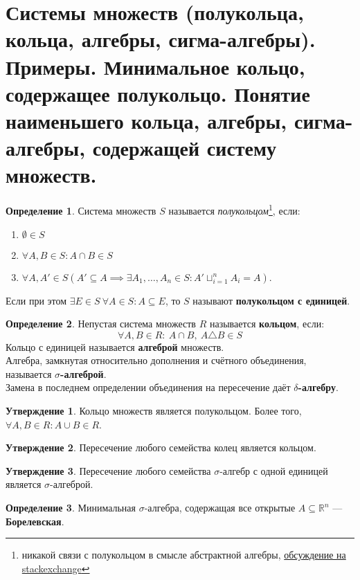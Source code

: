 \documentclass[11pt,a4paper]{report}
\def\Real{\mathbb{R}}
\theoremstyle{definition}
\theoremstyle{definition}
\newtheorem{preposition}{Утверждение}[section]
\theoremstyle{definition}
\newtheorem{definition}{Определение}[section]
\begin{document}
	\section{Системы множеств (полукольца, кольца, алгебры, сигма-алгебры). Примеры. Минимальное кольцо, содержащее полукольцо. Понятие наименьшего кольца, алгебры, сигма-алгебры, содержащей систему множеств.}
	\begin{definition}
		Система множеств $ S $ называется \textit{полукольцом}\footnote{никакой связи с полукольцом в смысле абстрактной алгебры, \href{https://math.stackexchange.com/questions/1864972/relation-between-semiring-of-sets-and-semiring-in-abstract-algebra}{обсуждение на stackexchange}}, если:
		\begin{enumerate}
			\item $ \emptyset \in S $
			\item $ \forall A, B \in S: A \cap B \in S $
			\item $ \forall A, A' \in S (A' \subseteq A \implies \exists A_{1}, \dots, A_{n} \in S: A' \sqcup_{i=1}^{n} A_{i} = A) $.
		\end{enumerate}
		Если при этом $ \exists E \in S\ \forall A \in S: A \subseteq E $, то $ S $ называют \textbf{полукольцом с единицей}.
	\end{definition}
	\begin{definition}
		Непустая система множеств $ R $ называется \textbf{кольцом}, если: 
		\[ \forall A, B \in R:\ A \cap B,\ A \triangle B \in S \]
		 Кольцо с единицей называется \textbf{алгеброй} множеств.\\ 
		 Алгебра, замкнутая относительно дополнения и счётного объединения, называется \textbf{$ \sigma $-алгеброй}.\\
		 Замена в последнем определении объединения на пересечение даёт \textbf{$ \delta $-алгебру}.
	\end{definition}
	\begin{preposition}
		Кольцо множеств является полукольцом. Более того, $ \forall A, B \in R: A \cup B \in R $.
	\end{preposition}
	\begin{preposition}
		Пересечение любого семейства колец является кольцом.
	\end{preposition}
	\begin{preposition}
		 Пересечение любого семейства $ \sigma $-алгебр с одной единицей является $ \sigma $-алгеброй.
	\end{preposition}
	\begin{definition}
		Минимальная $ \sigma $-алгебра, содержащая все открытые $ A \subseteq \Real^{n} $ — \textbf{Борелевская}.
	\end{definition}
\end{document}
